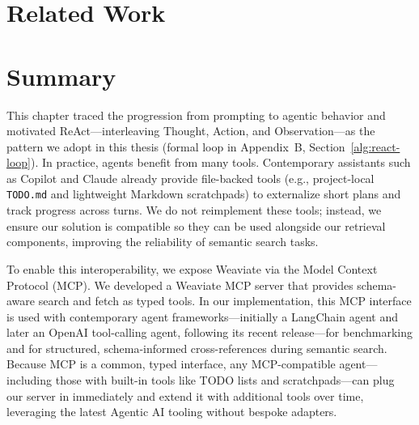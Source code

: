 \section{Related Work}

\section{Summary}
This chapter traced the progression from prompting to agentic behavior and motivated ReAct—interleaving Thought, Action, and Observation—as the pattern we adopt in this thesis (formal loop in Appendix~B, Section~\ref{alg:react-loop}). In practice, agents benefit from many tools. Contemporary assistants such as Copilot and Claude already provide file-backed tools (e.g., project-local \texttt{TODO.md} and lightweight Markdown scratchpads) to externalize short plans and track progress across turns. We do not reimplement these tools; instead, we ensure our solution is compatible so they can be used alongside our retrieval components, improving the reliability of semantic search tasks.

To enable this interoperability, we expose Weaviate via the Model Context Protocol (MCP). We developed a Weaviate MCP server that provides schema-aware search and fetch as typed tools. In our implementation, this MCP interface is used with contemporary agent frameworks—initially a LangChain agent and later an OpenAI tool-calling agent, following its recent release—for benchmarking and for structured, schema-informed cross-references during semantic search. Because MCP is a common, typed interface, any MCP-compatible agent—including those with built-in tools like TODO lists and scratchpads—can plug our server in immediately and extend it with additional tools over time, leveraging the latest Agentic AI tooling without bespoke adapters.